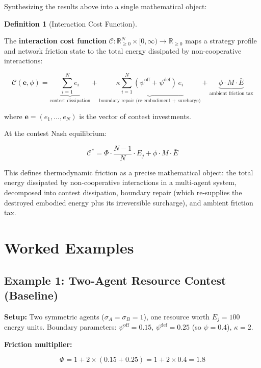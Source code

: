 \documentclass[11pt]{article}
\theoremstyle{plain}
\theoremstyle{definition}
\newtheorem{definition}{Definition}
\theoremstyle{remark}
\let\origsection\section
\renewcommand{\section}{\needspace{12\baselineskip}\origsection}
\let\origsubsection\subsection
\renewcommand{\subsection}{\needspace{7\baselineskip}\origsubsection}
\begin{document}
Synthesizing the results above into a single mathematical object:

\begin{definition}[Interaction Cost Function]
\label{def-interaction-cost-function}

The \textbf{interaction cost function} $\mathcal{C} : \mathbb{R}_{\geq 0}^N \times [0, \infty) \to \mathbb{R}_{\geq 0}$ maps a strategy profile and network friction state to the total energy dissipated by non-cooperative interactions:

$$\mathcal{C}(\mathbf{e}, \phi) = \underbrace{\sum_{i=1}^{N} e_i}_{\text{contest dissipation}} + \underbrace{\kappa \sum_{i=1}^{N} (\psi^{\text{off}} + \psi^{\text{def}}) \, e_i}_{\text{boundary repair (re-embodiment + surcharge)}} + \underbrace{\phi \cdot M \cdot \bar{E}}_{\text{ambient friction tax}}$$

where $\mathbf{e} = (e_1, \ldots, e_N)$ is the vector of contest investments.

At the contest Nash equilibrium:

$$\mathcal{C}^* = \Phi \cdot \frac{N-1}{N} \cdot E_j + \phi \cdot M \cdot \bar{E}$$
\end{definition}

This defines thermodynamic friction as a precise mathematical object:
the total energy dissipated by non-cooperative interactions in a
multi-agent system, decomposed into contest dissipation, boundary repair
(which re-supplies the destroyed embodied energy plus its irreversible
surcharge), and ambient friction tax.

\section{Worked Examples}\label{worked-examples}

\subsection{Example 1: Two-Agent Resource Contest
(Baseline)}\label{example-1-two-agent-resource-contest-baseline}

\textbf{Setup:} Two symmetric agents (\(\sigma_A = \sigma_B = 1\)), one
resource worth \(E_j = 100\) energy units. Boundary parameters:
\(\psi^{\text{off}} = 0.15\), \(\psi^{\text{def}} = 0.25\) (so
\(\psi = 0.4\)), \(\kappa = 2\).

\textbf{Friction multiplier:}

\[\Phi = 1 + 2 \times (0.15 + 0.25) = 1 + 2 \times 0.4 = 1.8\]
\end{document}
